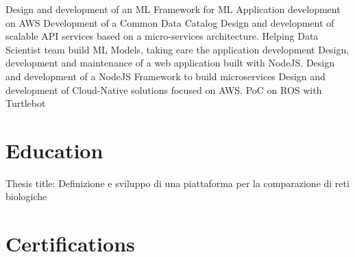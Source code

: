 \documentclass[letterpaper]{twentysecondcv} %
\begin{document}
\begin{twenty} %
	{
	    Design and development of an ML Framework for ML Application development on AWS
	    \newline
	    Development of a Common Data Catalog
	    \newline
	    Design and development of scalable API services based on a micro-services architecture.
	    \newline
	    Helping Data Scientist team build ML Models, taking care the application development
    }
	\tw
	{
	    Design, development and maintenance of a web application built with NodeJS.
	    \newline 
	    Design and development of a NodeJS Framework to build microservices
	    \newline
	    Design and development of Cloud-Native solutions focused on AWS.
	    \newline
	    PoC on ROS with Turtlebot
    }
\end{twenty}


\section{Education}

\begin{twenty} %
	{Thesis title: Definizione e sviluppo di una piattaforma per la comparazione di reti biologiche}
\end{twenty}


\section{Certifications}
\end{document}
